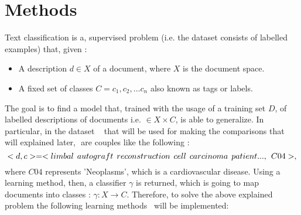 \section{Methods}
Text classification is a, supervised problem (i.e. the dataset consists of labelled examples) that, given :
\begin{itemize}
    \item A description \( d \in X \) of a document, where \(X\) is the document space.
    \item A fixed set of classes \(C = {c_1,c_2,...c_n}\) also known as tags or labels.
\end{itemize}
The goal is to find a model that, trained with the usage of a training set \(D\), of labelled descriptions of documents i.e. \(<d,c> \in X \times C\), is able to generalize.
In particular, in the dataset ~\cite{dataset-r8r52ohsumed} that will be used for making the comparisons that will explained later, \(<d,c>\) are couples like the following : 
\begin{equation}
    <d,c> = <limbal\hspace{0.15cm}autograft\hspace{0.15cm}reconstruction\hspace{0.15cm}cell\hspace{0.15cm}carcinoma\hspace{0.15cm}patient ... ,\hspace{0.15cm}C04>,
\end{equation}
where $C04$ represents 'Neoplasms', which is a cardiovascular disease.
Using a learning method, then, a classifier \(\gamma\) is returned, which is going to map documents into classes : \(\gamma : X \rightarrow C\).
\newline
Therefore, to solve the above explained problem the following learning methods~\cite{paper-text-classification-algorithms} will be implemented:
